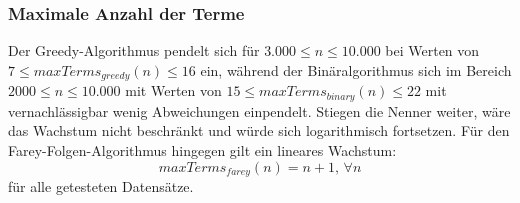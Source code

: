 

\subsubsection{Maximale Anzahl der Terme}
 Der Greedy-Algorithmus pendelt sich für $3.000 \leq n \leq 10.000$ bei Werten von $7 \leq maxTerms_{greedy}(n) \leq 16$ ein, während der Binäralgorithmus sich im Bereich $2000 \leq n \leq 10.000$ mit Werten von $15 \leq maxTerms_{binary}(n) \leq 22$ mit vernachlässigbar wenig Abweichungen einpendelt. Stiegen die Nenner weiter, wäre das Wachstum nicht beschränkt und würde sich logarithmisch fortsetzen. Für den Farey-Folgen-Algorithmus hingegen gilt ein lineares Wachstum:
$$maxTerms_{farey}(n) = n + 1, \, \forall n$$
für alle getesteten Datensätze. 


